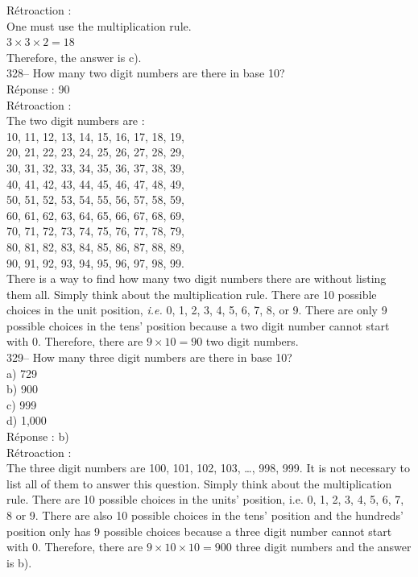 \documentclass[letterpaper, 12pt]{article}
\begin{document}
R\'etroaction : \\
One must use the multiplication rule.\\
$3\times3\times2=18$\\
Therefore, the answer is c).\\


328-- How many two digit numbers are there in base 10?\\

R\'eponse : 90\\

R\'etroaction :\\
The two digit numbers are :\\

10, 11, 12, 13, 14, 15, 16, 17, 18, 19, \\
20, 21, 22, 23, 24, 25, 26, 27, 28, 29, \\
30, 31, 32, 33, 34, 35, 36, 37, 38, 39, \\
40, 41, 42, 43, 44, 45, 46, 47, 48, 49, \\
50, 51, 52, 53, 54, 55, 56, 57, 58, 59, \\
60, 61, 62, 63, 64, 65, 66, 67, 68, 69, \\
70, 71, 72, 73, 74, 75, 76, 77, 78, 79, \\
80, 81, 82, 83, 84, 85, 86, 87, 88, 89, \\
90, 91, 92, 93, 94, 95, 96, 97, 98, 99. \\

There is a way to find how many two digit numbers there are without
listing them all. Simply think about the multiplication rule. There
are 10 possible choices in the unit position, \emph{i.e.} 0, 1, 2,
3, 4, 5, 6, 7, 8, or 9. There are only 9 possible choices in the
tens' position because a
two digit number cannot start with 0. Therefore, there are $9\times10=90$ two digit numbers.\\

329-- How many three digit numbers are there in base 10?\\

a) 729\\
b) 900\\
c) 999\\
d) 1,000\\

R\'eponse : b)\\

R\'etroaction : \\
The three digit numbers are 100, 101, 102, 103, \ldots , 998, 999.
It is not necessary to list all of them to answer this question. Simply think about the multiplication rule. There are 10 possible choices in the units' position, i.e. 0, 1, 2, 3, 4, 5, 6, 7, 8 or 9. There are also 10 possible choices in the tens' position and the hundreds' position only has 9 possible choices because a three digit number cannot start with 0. Therefore, there are $9\times10\times10=900$ three digit numbers and the answer is b).\\
\end{document}
